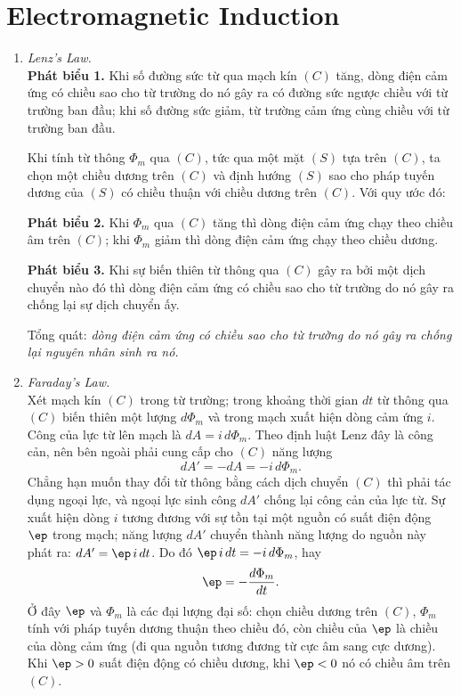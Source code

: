 \section{Electromagnetic Induction}
\begin{enumerate}
\item \textit{Lenz's Law.}\\
\textbf{Phát biểu 1.} Khi số đường sức từ qua mạch kín $(C)$ tăng, dòng điện cảm ứng có chiều sao cho từ trường do nó gây ra có đường sức ngược chiều với từ trường ban đầu; khi số đường sức giảm, từ trường cảm ứng cùng chiều với từ trường ban đầu.

Khi tính từ thông $\Phi_m$ qua $(C)$, tức qua một mặt $(S)$ tựa trên $(C)$, ta chọn một chiều dương trên $(C)$ và định hướng $(S)$ sao cho pháp tuyến dương của $(S)$ có chiều thuận với chiều dương trên $(C)$. Với quy ước đó:

\textbf{Phát biểu 2.} Khi $\Phi_m$ qua $(C)$ tăng thì dòng điện cảm ứng chạy theo chiều âm trên $(C)$; khi $\Phi_m$ giảm thì dòng điện cảm ứng chạy theo chiều dương.

\textbf{Phát biểu 3.} Khi sự biến thiên từ thông qua $(C)$ gây ra bởi một dịch chuyển nào đó thì dòng điện cảm ứng có chiều sao cho từ trường do nó gây ra chống lại sự dịch chuyển ấy.

Tổng quát: \textit{dòng điện cảm ứng có chiều sao cho từ trường do nó gây ra chống lại nguyên nhân sinh ra nó.}

\item \textit{Faraday's Law.}\\
Xét mạch kín $(C)$ trong từ trường; trong khoảng thời gian $dt$ từ thông qua $(C)$ biến thiên một lượng $d\Phi_m$ và trong mạch xuất hiện dòng cảm ứng $i$. Công của lực từ lên mạch là $dA = i\,d\Phi_m$. Theo định luật Lenz đây là công cản, nên bên ngoài phải cung cấp cho $(C)$ năng lượng
\[
dA' = -dA = -i\,d\Phi_m.
\]
Chẳng hạn muốn thay đổi từ thông bằng cách dịch chuyển $(C)$ thì phải tác dụng ngoại lực, và ngoại lực sinh công $dA'$ chống lại công cản của lực từ. Sự xuất hiện dòng $i$ tương đương với sự tồn tại một nguồn có suất điện động $\ep$ trong mạch; năng lượng $dA'$ chuyển thành năng lượng do nguồn này phát ra: $dA' = \ep\,i\,dt$. Do đó $\ep\,i\,dt = -i\,d\Phi_m$, hay
\begin{equation}\label{eq:faraday}
\ep = -\frac{d\Phi_m}{dt}.
\end{equation}
Ở đây $\ep$ và $\Phi_m$ là các đại lượng đại số: chọn chiều dương trên $(C)$, $\Phi_m$ tính với pháp tuyến dương thuận theo chiều đó, còn chiều của $\ep$ là chiều của dòng cảm ứng (đi qua nguồn tương đương từ cực âm sang cực dương). Khi $\ep > 0$ suất điện động có chiều dương, khi $\ep < 0$ nó có chiều âm trên $(C)$.


\end{enumerate}
